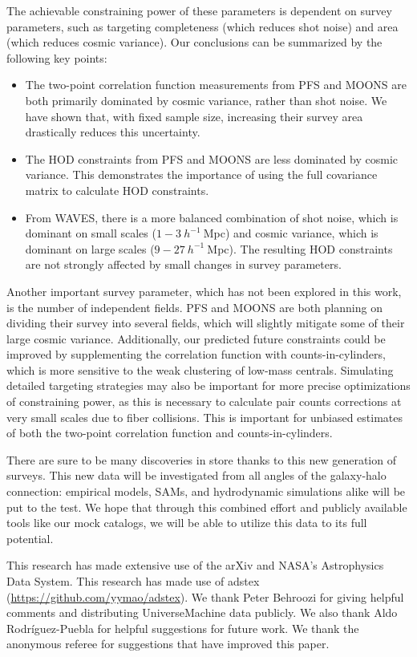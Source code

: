 \documentclass[twocolumn,twocolappendix]{aastex63}
\begin{document}
The achievable constraining power of these parameters is dependent on survey parameters, such as {targeting} completeness (which reduces shot noise) and area (which reduces cosmic variance). Our conclusions can be summarized by the following key points:
\begin{itemize}
    \item The two-point correlation function measurements from PFS and MOONS are both primarily dominated by cosmic variance, rather than shot noise. We have shown that, with fixed sample size, increasing their survey area drastically reduces this uncertainty.
    \item The HOD constraints from PFS and MOONS are less dominated by cosmic variance. This demonstrates the importance of using the full covariance matrix to calculate HOD constraints.
    \item From WAVES, there is a more balanced combination of shot noise, which is dominant on small scales ($1-3~h^{-1}~$Mpc) and cosmic variance, which is dominant on large scales ($9-27~h^{-1}~$Mpc). The resulting HOD constraints are not strongly affected by small changes in survey parameters.
\end{itemize}

Another important survey parameter, which has not been explored in this work, is the number of independent fields. PFS and MOONS are both planning on dividing their survey into several fields, which will slightly mitigate some of their large cosmic variance. Additionally, our predicted future constraints could be improved by supplementing the correlation function with counts-in-cylinders, which is more sensitive to the weak clustering of low-mass centrals. Simulating detailed targeting strategies may also be important for more precise optimizations of constraining power, as this is necessary to calculate pair counts corrections at very small scales due to fiber collisions. This is important for unbiased estimates of both the two-point correlation function and counts-in-cylinders.

There are sure to be many discoveries in store thanks to this new generation of surveys. This new data will be investigated from all angles of the galaxy-halo connection: empirical models, SAMs, and hydrodynamic simulations alike will be put to the test. We hope that through this combined effort and publicly available tools like our mock catalogs, we will be able to utilize this data to its full potential.

\acknowledgements
This research has made extensive use of the arXiv and NASA's Astrophysics Data System.
This research has made use of adstex (\url{https://github.com/yymao/adstex}).
We thank Peter Behroozi for giving helpful comments and distributing UniverseMachine data publicly. We also thank Aldo Rodr\'{i}guez-Puebla for helpful suggestions for future work. We thank the anonymous referee for suggestions that have improved this paper.
\end{document}
